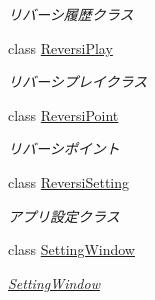 \begin{DoxyCompactItemize}
\begin{DoxyCompactList}\small\item\em リバーシ履歴クラス \end{DoxyCompactList}\item 
class \hyperlink{class_reversi4color_wpf_1_1_reversi_play}{Reversi\+Play}
\begin{DoxyCompactList}\small\item\em リバーシプレイクラス \end{DoxyCompactList}\item 
class \hyperlink{class_reversi4color_wpf_1_1_reversi_point}{Reversi\+Point}
\begin{DoxyCompactList}\small\item\em リバーシポイント \end{DoxyCompactList}\item 
class \hyperlink{class_reversi4color_wpf_1_1_reversi_setting}{Reversi\+Setting}
\begin{DoxyCompactList}\small\item\em アプリ設定クラス \end{DoxyCompactList}\item 
class \hyperlink{class_reversi4color_wpf_1_1_setting_window}{Setting\+Window}
\begin{DoxyCompactList}\small\item\em \hyperlink{class_reversi4color_wpf_1_1_setting_window}{Setting\+Window} \end{DoxyCompactList}\end{DoxyCompactItemize}
